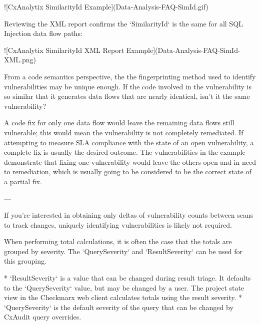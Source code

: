 ![CxAnalytix SimilarityId Example](Data-Analysis-FAQ-SimId.gif)

Reviewing the XML report confirms the `SimilarityId` is the same for all SQL Injection data flow paths:

![CxAnalytix SimilarityId XML Report Example](Data-Analysis-FAQ-SimId-XML.png)



From a code semantics perspective, the the fingerprinting method used to identify vulnerabilities may be unique enough.  If the code involved in the vulnerability is so similar that it generates data flows that are nearly identical, isn't it the same vulnerability?  

A code fix for only one data flow would leave the remaining data flows still vulnerable; this would mean the vulnerability is not completely remediated.  If attempting to measure SLA compliance with the state of an open vulnerability, a complete fix is usually the desired outcome.  The vulnerabilities in the example demonstrate that fixing one vulnerability would leave the others open and in need to remediation, which is usually going to be considered to be the correct state of a partial fix.

---


If you're interested in obtaining only deltas of vulnerability counts between scans to track changes, uniquely identifying vulnerabilities is likely not required.

When performing total calculations, it is often the case that the totals are grouped by severity.  The `QuerySeverity` and `ResultSeverity` can be used for this grouping.

* `ResultSeverity` is a value that can be changed during result triage.  It defaults to the `QuerySeverity` value, but may be changed by a user. The project state view in the Checkmarx web client calculates totals using the result severity.
* `QuerySeverity` is the default severity of the query that can be changed by CxAudit query overrides.


